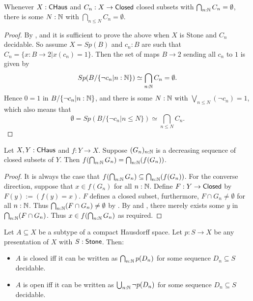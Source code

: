 \begin{lemma}\label{CHausFiniteIntersectionProperty}
  Whenever $X:\mathsf{CHaus}$ and $C_n:X\to \mathsf{Closed}$ closed subsets with $\bigcap_{n:\mathbb{N}} C_n =\emptyset$, there is some $N:\mathbb{N}$ 
  with $\bigcap_{n\leq N} C_n  = \emptyset$. 
\end{lemma}
\begin{proof}
  By , and  
  it is sufficient to prove the above when $X$ is Stone and $C_n$ decidable.
  So assume 
  $X=Sp(B)$ and $c_n:B$ are such that $C_n = \{x:B\to 2 | x(c_n) = 1\}$. 
  Then the set of maps $B\to 2$ sending all $c_n$ to $1$ is given by 
  $$Sp(B/\{\neg c_n |n:\mathbb{N}\}) \simeq \bigcap_{n:\mathbb{N}} C_n = \emptyset .$$
  Hence 
  $0=1$ in $B/\{\neg c_n|{n:\mathbb{N}}\}$, and there is some $N:\mathbb{N}$ with 
  $\bigvee_{n\leq N} (\neg c_n) = 1$, which also means that 
  $$\emptyset = Sp(B/\{ \neg c_n| n \leq N\})  \simeq \bigcap_{n\leq N} C_n .$$
\end{proof}
\begin{corollary}\label{ChausMapsPreserveIntersectionOfClosed}
  Let $X,Y:\mathsf{CHaus}$ and $f:Y \to X$. 
  Suppose $(G_n)_{n:\mathbb{N}}$ is a decreasing sequence of closed subsets of $Y$. 
  Then $f(\bigcap_{n:\mathbb{N}} G_n) = \bigcap_{n:\mathbb{N}}(f(G_n))$. 
\end{corollary}
\begin{proof}
  It is always the case that $f(\bigcap_{n:\mathbb{N}} G_n) \subseteq \bigcap_{n:\mathbb{N}} (f(G_n))$. 
  For the converse direction, suppose that $x \in f(G_n)$ for all $n:\mathbb{N}$. 
  Define $F: Y \to \mathsf{Closed}$ by $F(y) := \left(f(y) = x\right)$. 
  $F$ defines a closed subset, furthermore, $F\cap G_n \neq \emptyset$ for all $n:\mathbb{N}$. 
  Thus $\bigcap_{n:\mathbb{N}}(F\cap G_n) \neq \emptyset$ by . 
  By  and , there merely exists some 
  $y$ in $\bigcap_{n:\mathbb{N}} (F\cap G_n)$. Thus $x\in f(\bigcap_{n:\mathbb{N}} G_n)$ as required. 
\end{proof}
\begin{corollary}\label{CompactHausdorffTopology}
Let $A\subseteq X$ be a subtype of a compact Hausdorff space. 
Let $p:S\to X$ be any presentation of $X$ with $S:\mathsf{Stone}$. Then:
\begin{itemize}
  \item $A$ is closed iff it can be written as $\bigcap_{n:\mathbb{N}} p(D_n)$
for some sequence $D_n\subseteq S$ decidable. 
  \item $A$ is open iff it can be written as $\bigcup_{n:\mathbb{N}} \neg p(D_n)$
for some sequence $D_n\subseteq S$ decidable.
\end{itemize}  
\end{corollary}
